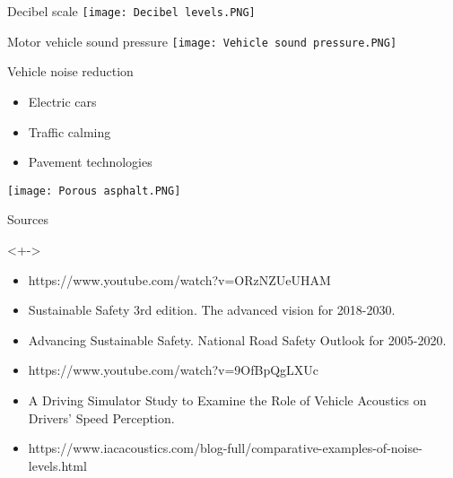 \documentclass{beamer}
\begin{document}
    \begin{frame}{Decibel scale}
        \texttt{[image: Decibel levels.PNG]}
    \end{frame}

    \begin{frame}{Motor vehicle sound pressure}
        \texttt{[image: Vehicle sound pressure.PNG]}
    \end{frame}

    \begin{frame}{Vehicle noise reduction}
        \begin{block}{}
            \begin{itemize}
                \item Electric cars
                \item Traffic calming
                \item Pavement technologies
            \end{itemize}
            \texttt{[image: Porous asphalt.PNG]}
        \end{block}

    \end{frame}

    \begin{frame}{Sources}
        \begin{block}
            <+->{}
            \begin{itemize}
                \item https://www.youtube.com/watch?v=ORzNZUeUHAM
                \item Sustainable Safety 3rd edition. The advanced vision for 2018-2030.
                \item Advancing Sustainable Safety. National Road Safety Outlook for 2005-2020.
                \item https://www.youtube.com/watch?v=9OfBpQgLXUc
                \item A Driving Simulator Study to Examine the Role of Vehicle Acoustics on Drivers’ Speed Perception.
                \item https://www.iacacoustics.com/blog-full/comparative-examples-of-noise-levels.html
            \end{itemize}
        \end{block}
    \end{frame}
\end{document}
